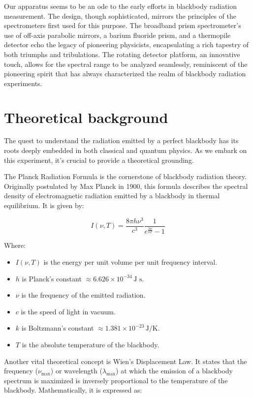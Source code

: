 \documentclass[10pt,letterpaper,onecolumn]{article}
\begin{document}
Our apparatus seems to be an ode to the early efforts in blackbody 
radiation measurement. The design, though sophisticated, mirrors the 
principles of the spectrometers first used for this purpose. The broadband 
prism spectrometer's use of off-axis parabolic mirrors, a barium fluoride 
prism, and a thermopile detector echo the legacy of pioneering physicists, 
encapsulating a rich tapestry of both triumphs and tribulations. The rotating 
detector platform, an innovative touch, allows for the spectral range to be 
analyzed seamlessly, reminiscent of the pioneering spirit that has always 
characterized the realm of blackbody radiation experiments.


\section{Theoretical background}


The quest to understand the radiation emitted by a perfect blackbody has its roots deeply embedded in both 
classical and quantum physics. As we embark on this experiment, it's crucial to provide a theoretical grounding.

The Planck Radiation Formula is the cornerstone of blackbody radiation theory. 
Originally postulated by Max Planck in 1900, this formula describes the spectral density of electromagnetic 
radiation emitted by a blackbody in thermal equilibrium. It is given by:

\[ I(\nu, T) = \frac{8\pi h\nu^3}{c^3} \frac{1}{e^{\frac{h\nu}{kT}} - 1} \]

Where:
\begin{itemize}
  \item \(I(\nu, T)\) is the energy per unit volume per unit frequency interval.
  \item \(h\) is Planck's constant \(\approx 6.626 \times 10^{-34} \, \text{J s}\).
  \item \(\nu\) is the frequency of the emitted radiation.
  \item \(c\) is the speed of light in vacuum.
  \item \(k\) is Boltzmann's constant \(\approx 1.381 \times 10^{-23} \, \text{J/K}\).
  \item \(T\) is the absolute temperature of the blackbody\cite{planck_1900}.
\end{itemize}

Another vital theoretical concept is Wien's Displacement Law. 
It states that the frequency (\(\nu_{\text{max}}\)) or wavelength (\(\lambda_{\text{max}}\)) at 
which the emission of a blackbody spectrum is maximized is inversely proportional to the temperature of 
the blackbody. Mathematically, it is expressed as:
\end{document}
